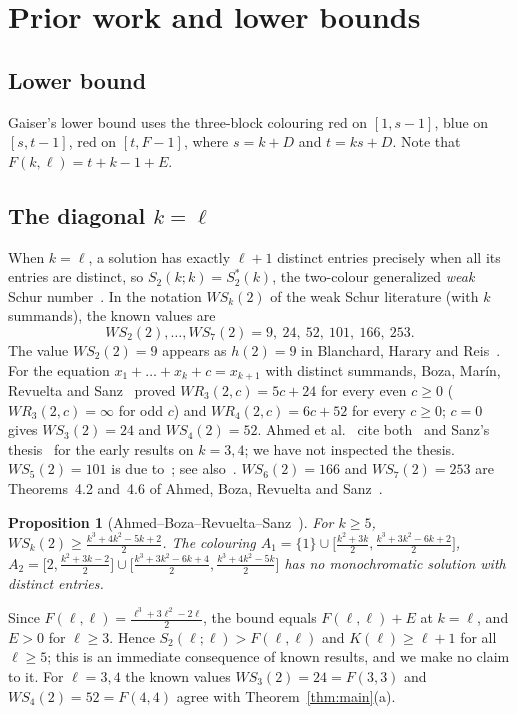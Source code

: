 \documentclass[11pt]{amsart}
\newtheorem{proposition}[theorem]{Proposition}
\theoremstyle{definition}
\newcommand{\F}{F}
\newcommand{\Stwo}{S_2}
\begin{document}
\section{Prior work and lower bounds}\label{sec:prior}

\subsection*{Lower bound} Gaiser's lower bound uses the three-block colouring red on $[1,s-1]$, blue on $[s,t-1]$, red on $[t,\F-1]$, where $s=k+D$ and $t=ks+D$. Note that $\F(k,\ell)=t+k-1+E$.

\subsection*{The diagonal $k=\ell$} When $k=\ell$, a solution has exactly $\ell+1$ distinct entries precisely when all its entries are distinct, so $\Stwo(k;k)=S_2^*(k)$, the two-colour generalized \emph{weak} Schur number~\cite{Gaiser}. In the notation $WS_k(2)$ of the weak Schur literature (with $k$ summands), the known values are
\[
WS_2(2),\dots,WS_7(2)=9,\ 24,\ 52,\ 101,\ 166,\ 253.
\]
The value $WS_2(2)=9$ appears as $h(2)=9$ in Blanchard, Harary and Reis~\cite{BHR}. For the equation $x_1+\dots+x_k+c=x_{k+1}$ with distinct summands, Boza, Mar\'in, Revuelta and Sanz~\cite{BMRS} proved $WR_3(2,c)=5c+24$ for every even $c\ge0$ ($WR_3(2,c)=\infty$ for odd $c$) and $WR_4(2,c)=6c+52$ for every $c\ge0$; $c=0$ gives $WS_3(2)=24$ and $WS_4(2)=52$. Ahmed et al.~\cite{ABRS} cite both~\cite{BMRS} and Sanz's thesis~\cite{Sanz} for the early results on $k=3,4$; we have not inspected the thesis. $WS_5(2)=101$ is due to~\cite{BMRS}; see also~\cite{BRS}. $WS_6(2)=166$ and $WS_7(2)=253$ are Theorems~4.2 and~4.6 of Ahmed, Boza, Revuelta and Sanz~\cite{ABRS}.

\begin{proposition}[Ahmed--Boza--Revuelta--Sanz~{\cite[Lemma~2.1]{ABRS}}]\label{prop:ahmed}
For $k\ge5$, $WS_k(2)\ge\frac{k^3+4k^2-5k+2}{2}$. The colouring $A_1=\{1\}\cup\bigl[\tfrac{k^2+3k}{2},\tfrac{k^3+3k^2-6k+2}{2}\bigr]$, $A_2=\bigl[2,\tfrac{k^2+3k-2}{2}\bigr]\cup\bigl[\tfrac{k^3+3k^2-6k+4}{2},\tfrac{k^3+4k^2-5k}{2}\bigr]$ has no monochromatic solution with distinct entries.
\end{proposition}

\noindent Since $\F(\ell,\ell)=\frac{\ell^3+3\ell^2-2\ell}{2}$, the bound equals $\F(\ell,\ell)+E$ at $k=\ell$, and $E>0$ for $\ell\ge3$. Hence $\Stwo(\ell;\ell)>\F(\ell,\ell)$ and $K(\ell)\ge\ell+1$ for all $\ell\ge5$; this is an immediate consequence of known results, and we make no claim to it. For $\ell=3,4$ the known values $WS_3(2)=24=\F(3,3)$ and $WS_4(2)=52=\F(4,4)$ agree with Theorem~\ref{thm:main}(a).
\end{document}
